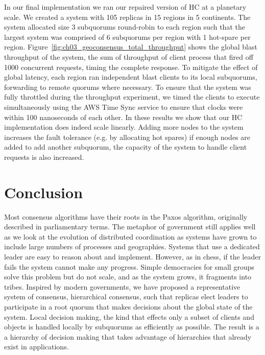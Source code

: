 In our final implementation we ran our repaired version of HC at a planetary scale.
We created a system with 105 replicas in 15 regions in 5 continents.
The system allocated size 3 subquorums round-robin to each region such that the largest system was comprised of 6 subquorums per region with 1 hot-spare per region.
Figure~\ref{fig:ch03_geoconsensus_total_throughput} shows the global blast throughput of the system, the sum of throughput of client process that fired off 1000 concurrent requests, timing the complete response.
To mitigate the effect of global latency, each region ran independent blast clients to its local subquorums, forwarding to remote quorums where necessary.
To ensure that the system was fully throttled during the throughput experiment, we timed the clients to execute simultaneously using the AWS Time Sync service to ensure that clocks were within 100 nanoseconds of each other.
In these results we show that our HC implementation does indeed scale linearly.
Adding more nodes to the system increases the fault tolerance (e.g. by allocating hot spares) if enough nodes are added to add another subquorum, the capacity of the system to handle client requests is also increased.

\section{Conclusion}
\label{ch03_conclusion}

Most consensus algorithms have their roots in the Paxos algorithm, originally described in parliamentary terms.
The metaphor of government still applies well as we look at the evolution of distributed coordination as systems have grown to include large numbers of processes and geographies.
Systems that use a dedicated leader are easy to reason about and implement. However, as in chess, if the leader fails the system cannot make any progress.
Simple democracies for small groups solve this problem but do not scale, and as the system grows, it fragments into tribes.
Inspired by modern governments, we have proposed a representative system of consensus, hierarchical consensus, such that replicas elect leaders to participate in a root quorum that makes decisions about the global state of the system.
Local decision making, the kind that effects only a subset of clients and objects is handled locally by subquorums as efficiently as possible.
The result is a a hierarchy of decision making that takes advantage of hierarchies that already exist in applications.

